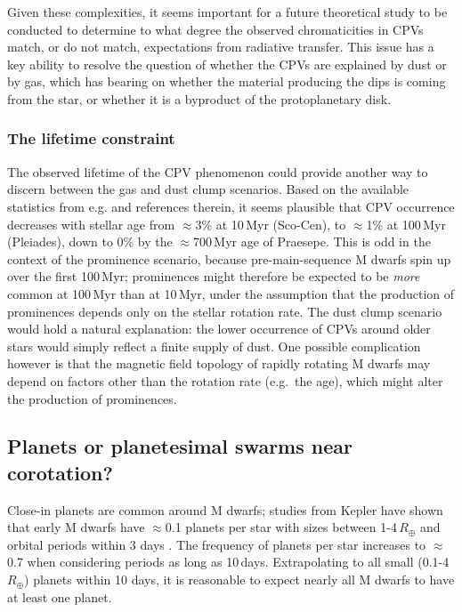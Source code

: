 \documentclass[11pt,twocolumn,tighten]{aastex63}
\begin{document}
Given these complexities, it seems important for a future theoretical
study to be conducted to determine to what degree the observed
chromaticities in CPVs match, or do not match, expectations from
radiative transfer.  This issue has a key ability to resolve the
question of whether the CPVs are explained by dust or by gas, which has
bearing on whether the material producing the dips is coming from the
star, or whether it is a byproduct of the protoplanetary disk.



\subsubsection{The lifetime constraint}

The observed lifetime of the CPV phenomenon could provide another way
to discern between the gas and dust clump scenarios.  Based on the
available statistics from e.g.  \citet{2022AJ....164...80R} and
references therein, it seems plausible that CPV occurrence decreases
with stellar age from $\approx$3\% at 10\,Myr (Sco-Cen),
to $\approx$1\% at 100\,Myr (Pleiades),
down to 0\% by the $\approx$700\,Myr
age of Praesepe.  This is odd in the context of the prominence
scenario, because pre-main-sequence M dwarfs spin up over the first
100\,Myr; prominences might therefore be expected to be {\it
more} common at 100\,Myr than at 10\,Myr, under the assumption that the
production of prominences depends only on the stellar rotation rate. 
The dust clump scenario would hold a natural explanation: the lower occurrence of CPVs around older stars would
simply reflect a finite supply of dust.
One possible complication however is that the magnetic field topology
of rapidly rotating M dwarfs may depend on factors other than the
rotation rate (e.g.\ the age), which might alter the production of prominences.


\subsection{Planets or planetesimal swarms near corotation?}

Close-in planets are common around M dwarfs; studies from Kepler have
shown that early M dwarfs have $\approx$0.1 planets per star with
sizes between 1-4\,$R_\oplus$ and orbital periods within 3 days
\citep{2015ApJ...807...45D}.  The frequency of planets per star
increases to $\approx$0.7 when considering periods as long as
10\,days.  Extrapolating to all small (0.1-4\,$R_\oplus$) planets within
10 days, it is reasonable to expect
nearly all M dwarfs to have at least one planet.
\end{document}
